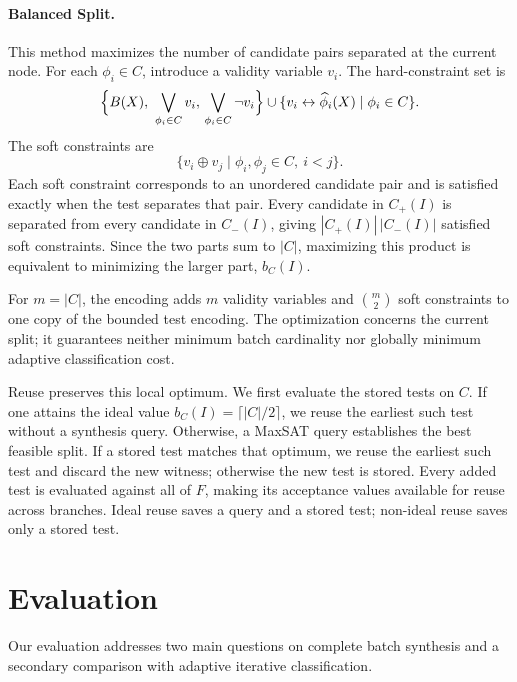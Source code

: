 \documentclass[runningheads]{llncs}
\newcommand{\methodname}[1]{\textup{\textsf{#1}}}
\newcommand{\balancedsplit}{\methodname{Balanced Split}}
\begin{document}
\paragraph{\balancedsplit{}.}
This method maximizes the number of candidate pairs separated at the current
node. For each $\phi_i\in C$, introduce a validity variable $v_i$. The
hard-constraint set is
\begin{equation}
\label{eq:balanced-feasibility}
  \Bigl\{B(X),\ \bigvee_{\phi_i\in C}v_i,\,
    \bigvee_{\phi_i\in C}\neg v_i\Bigr\}
    \cup\{v_i\leftrightarrow\widehat{\phi}_i(X)\mid\phi_i\in C\}.
\end{equation}
The soft constraints are
\begin{equation}
\label{eq:balanced-objective}
  \{v_i\oplus v_j\mid \phi_i,\phi_j\in C,\ i<j\}.
\end{equation}
Each soft constraint corresponds to an unordered candidate pair and is
satisfied exactly when the test separates that pair. Every candidate in
$C_+(I)$ is separated from every candidate in $C_-(I)$, giving
$|C_+(I)|\,|C_-(I)|$ satisfied soft constraints. Since the two parts sum to
$|C|$, maximizing this product is equivalent to minimizing the larger part,
$b_C(I)$.

For $m=|C|$, the encoding adds $m$ validity variables and $\binom m2$ soft
constraints to one copy of the bounded test encoding. The optimization
concerns the current split; it guarantees neither minimum batch cardinality
nor globally minimum adaptive classification cost.

Reuse preserves this local optimum. We first evaluate the stored tests on
$C$. If one attains the ideal value $b_C(I)=\lceil |C|/2\rceil$, we reuse the
earliest such test without a synthesis query. Otherwise, a MaxSAT query
establishes the best feasible split. If a stored test matches that optimum,
we reuse the earliest such test and discard the new witness; otherwise the
new test is stored. Every added test is evaluated against all of $F$, making
its acceptance values available for reuse across branches. Ideal reuse saves a query and a stored test; non-ideal reuse saves only a
stored test.

\section{Evaluation}
\label{sec:evaluation}

Our evaluation addresses two main questions on complete batch synthesis and a
secondary comparison with adaptive iterative classification.
\end{document}

